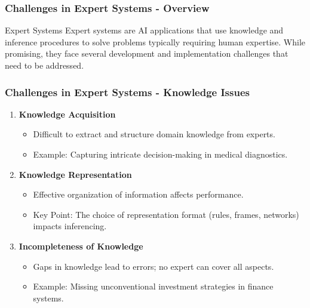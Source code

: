 \documentclass[aspectratio=169]{beamer}
\begin{document}
\begin{frame}[fragile]
    \frametitle{Challenges in Expert Systems - Overview}
    \begin{block}{Expert Systems}
        Expert systems are AI applications that use knowledge and inference procedures to solve problems typically requiring human expertise. While promising, they face several development and implementation challenges that need to be addressed.
    \end{block}
\end{frame}

\begin{frame}[fragile]
    \frametitle{Challenges in Expert Systems - Knowledge Issues}
    \begin{enumerate}
        \item \textbf{Knowledge Acquisition}
            \begin{itemize}
                \item Difficult to extract and structure domain knowledge from experts.
                \item Example: Capturing intricate decision-making in medical diagnostics.
            \end{itemize}
        
        \item \textbf{Knowledge Representation}
            \begin{itemize}
                \item Effective organization of information affects performance.
                \item Key Point: The choice of representation format (rules, frames, networks) impacts inferencing.
            \end{itemize}

        \item \textbf{Incompleteness of Knowledge}
            \begin{itemize}
                \item Gaps in knowledge lead to errors; no expert can cover all aspects.
                \item Example: Missing unconventional investment strategies in finance systems.
            \end{itemize}
    \end{enumerate}
\end{frame}
\end{document}
